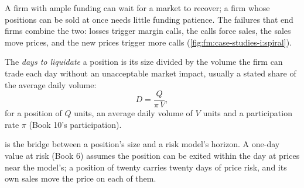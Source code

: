 A firm with ample funding can wait for a market to recover; a firm whose positions can be sold at once needs little funding patience. The failures
that end firms combine the two: losses trigger margin calls, the calls force sales, the sales move prices, and the new prices trigger more calls
(\cref{fig:fm:case-studies-i:spiral}).

\begin{omfigure}
\par
{}\label{fig:fm:case-studies-i:spiral}
\end{omfigure}

\begin{definition}\label{def:fm:case-studies-i:days}
The \emph{days to liquidate} a position is its size divided by the volume the firm can trade each day without an
unacceptable market impact, usually a stated share of the average daily volume:
\[ D=\frac{Q}{\pi\,V}, \]
for a position of $Q$ units, an average daily volume of $V$ units and a participation rate $\pi$ (Book 10's participation).
\end{definition}

 is the bridge between a position's size and a risk model's horizon. A one-day value at risk (Book 6) assumes the position can be
exited within the day at prices near the model's; a position of twenty  carries twenty days of price risk, and its own sales move the
price on each of them.

